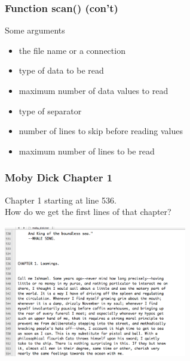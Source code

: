 \documentclass{beamer}\usepackage[]{graphicx}\usepackage[]{color}
\begin{document}

\begin{frame}[fragile]
\frametitle{Function scan() (con't)}

\begin{block}{Some  arguments}
\begin{itemize}
 \item {} the file name or a connection
 \item {} type of data to be read
 \item {} maximum number of data values to read
 \item {} type of separator
 \item {} number of lines to skip before reading values
 \item {} maximum number of lines to be read
\end{itemize}
\end{block}

\end{frame}


\begin{frame}
\frametitle{Moby Dick Chapter 1}

Chapter 1 starting at line 536. \\
How do we get the first lines of that chapter?
\begin{center}
\includegraphics[width=8cm]{images/moby_dick_535.png}
\end{center}

\end{frame}

\end{document}
